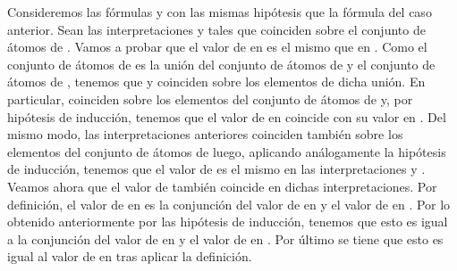 \begin{isabellebody}
\begin{isamarkuptext}
\begin{demostracion}
    Consideremos las fórmulas  y  con las mismas hipótesis que
    la fórmula del caso anterior. Sean las interpretaciones  y  
    tales que coinciden sobre el conjunto de átomos de . Vamos a
    probar que el valor de  en  es el mismo que en .
    Como el conjunto de átomos de  es la unión del conjunto de
    átomos de  y el conjunto de átomos de , tenemos que  y 
     coinciden sobre los elementos de dicha unión. En particular,
    coinciden sobre los elementos del conjunto de átomos de  y, por
    hipótesis de inducción, tenemos que el valor de  en  
    coincide con su valor en . Del mismo modo, las
    interpretaciones anteriores coinciden también sobre los elementos
    del conjunto de átomos de  luego, aplicando análogamente la 
    hipótesis de inducción, tenemos que el valor de  es el mismo 
    en las interpretaciones  y . Veamos ahora que el valor
    de  también coincide en dichas interpretaciones.
    Por definición, el valor de  en  es la conjunción
    del valor de  en  y el valor de  en . Por lo 
    obtenido anteriormente por las hipótesis de inducción, tenemos que
    esto es igual a la conjunción del valor de  en  y el
    valor de  en . Por último se tiene que esto es igual al
    valor de  en  tras aplicar la definición.


\end{demostracion}
\end{isamarkuptext}
\end{isabellebody}
